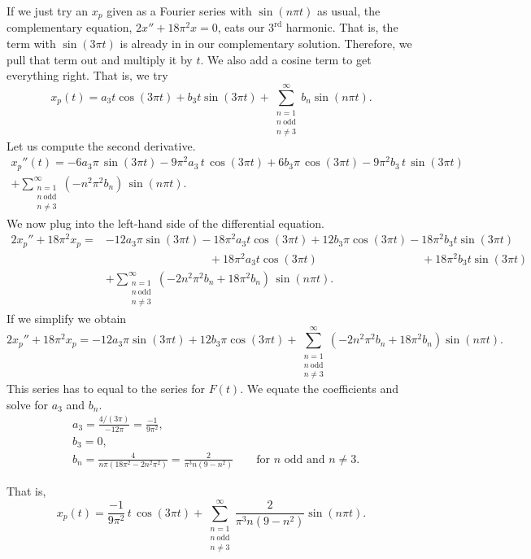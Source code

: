 \begin{example}
If we just try an $x_p$ given as a Fourier series with $\sin (n\pi t)$ as usual,
the complementary equation, $2x''+18\pi^2x=0$, eats our $3^\text{rd}$ harmonic.  That is, the term
with $\sin(3 \pi t)$
is already in
in our complementary solution.
Therefore, we pull that term out and
multiply it by $t$.  We also add a cosine term to get everything right.
That is, we try
\begin{equation*}
x_p(t) =
a_3
t \cos (3 \pi t )
+
b_3
t \sin (3 \pi t)
+
\sum_{\substack{n=1 \\ n~\text{odd} \\ n\not= 3}}^\infty
b_n
\sin (n \pi t) . 
\end{equation*}
Let us compute the second derivative.
\begin{multline*}
x_p''(t) =
- 6 a_3
\pi \, \sin (3 \pi t) - 9\pi^2 a_3 \, t \, \cos (3 \pi t)
+
6 b_3
\pi \, \cos (3 \pi t) - 9\pi^2 b_3 \, t \, \sin (3 \pi t)
\\
+
\sum_{\substack{n=1 \\ n~\text{odd} \\ n\not= 3}}^\infty
(-n^2 \pi^2 b_n ) \,
\sin (n \pi t) . 
\end{multline*}
We now plug into the left-hand side of the differential equation.
\begin{align*}
2x_p'' + 18\pi^2 x_p 
= & 
- 12 a_3 \pi \sin (3 \pi t)
- 18\pi^2 a_3 t \cos (3 \pi t)
+ 12 b_3 \pi \cos (3 \pi t)
- 18\pi^2 b_3 t \sin (3 \pi t)
\\
& \phantom{\, - 12 a_3 \pi \sin (3 \pi t)} ~
+ 18 \pi^2 a_3 t \cos (3 \pi t)
\phantom{\, + 12 b_3 \pi \cos (3 \pi t)} ~
+ 18 \pi^2 b_3 t \sin (3 \pi t)
\\
& + \sum_{\substack{n=1 \\ n~\text{odd} \\ n\not= 3}}^\infty
(-2n^2 \pi^2 b_n + 18\pi^2 b_n) \,
\sin (n \pi t) . 
\end{align*}
If we simplify we obtain
\begin{equation*}
2x_p'' + 18\pi^2 x_p =
- 12 a_3
\pi \sin (3 \pi t)
+
12 b_3
\pi \cos (3 \pi t)
+
\sum_{\substack{n=1 \\ n~\text{odd} \\ n\not= 3}}^\infty
(-2n^2 \pi^2 b_n + 18\pi^2 b_n)
\sin (n \pi t) . 
\end{equation*}
This series has to equal to the series for $F(t)$.
We equate the coefficients and solve for $a_3$ and $b_n$.
\begin{align*}
& a_3 = \frac{4/(3\pi)}{-12\pi} = \frac{-1}{9\pi^2} , \\
& b_3 = 0 , \\
& b_n = \frac{4}{n\pi(18\pi^2 - 2n^2 \pi^2)} 
= \frac{2}{\pi^3 n(9 - n^2)} \qquad \text{for } n \text{ odd and } n\not=3 .
\end{align*}

That is,
\begin{equation*}
x_p(t) =
\frac{-1}{9\pi^2}
\,
t \, \cos (3 \pi t)
+
\sum_{\substack{n=1 \\ n~\text{odd} \\ n\not= 3}}^\infty
\frac{2}{\pi^3 n(9 - n^2)}
\sin (n \pi t) . 
\end{equation*}
\end{example}

